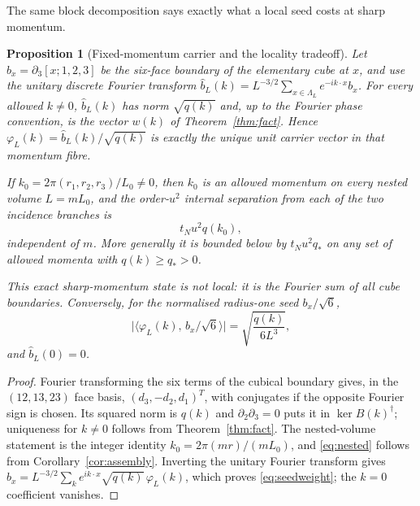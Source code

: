 \documentclass[11pt]{article}
\theoremstyle{plain}
\newtheorem{proposition}[theorem]{Proposition}
\theoremstyle{definition}
\theoremstyle{remark}
\newcommand{\chk}[1]{}
\newcommand{\dg}{^{\dagger}}
\begin{document}
The same block decomposition says exactly what a local seed costs at sharp
momentum.

\begin{proposition}[Fixed-momentum carrier and the locality tradeoff]\label{prop:locality}\label{prop:fixed-k-carrier}
Let $b_x=\partial_3[x;1,2,3]$ be the six-face boundary of the elementary cube
at $x$, and use the unitary discrete Fourier transform
$\hat b_L(k)=L^{-3/2}\sum_{x\in\Lambda_L}e^{-ik\cdot x}b_x$. For every allowed
$k\neq0$, $\hat b_L(k)$ has norm $\sqrt{q(k)}$ and, up to the Fourier phase
convention, is the vector $w(k)$ of Theorem~\ref{thm:fact}. Hence
$\varphi_L(k)=\hat b_L(k)/\sqrt{q(k)}$ is exactly the unique unit carrier
vector in that momentum fibre.

If $k_0=2\pi(r_1,r_2,r_3)/L_0\neq0$, then $k_0$ is an allowed momentum on
every nested volume $L=mL_0$, and the order-$u^2$ internal separation from
each of the two incidence branches is
\begin{equation}\label{eq:nested}
  t_Nu^2q(k_0),
\end{equation}
independent of $m$. More generally it is bounded below by $t_Nu^2q_*$ on any
set of allowed momenta with $q(k)\ge q_*>0$.

This exact sharp-momentum state is not local: it is the Fourier sum of all
cube boundaries. Conversely, for the normalised radius-one seed
$b_x/\sqrt6$,
\begin{equation}\label{eq:seedweight}
  \bigl|\langle\varphi_L(k),\,b_x/\sqrt6\rangle\bigr|
  =\sqrt{\frac{q(k)}{6L^3}},
\end{equation}
and $\hat b_L(0)=0$.
\end{proposition}

\begin{proof}
Fourier transforming the six terms of the cubical boundary gives, in the
$(12,13,23)$ face basis, $(d_3,-d_2,d_1)^T$, with conjugates if the opposite
Fourier sign is chosen. Its squared norm is $q(k)$ and
$\partial_2\partial_3=0$ puts it in $\ker B(k)\dg$; uniqueness for $k\neq0$
follows from Theorem~\ref{thm:fact}. The nested-volume statement is the
integer identity $k_0=2\pi(mr)/(mL_0)$, and \eqref{eq:nested} follows from
Corollary~\ref{cor:assembly}. Inverting the unitary Fourier transform gives
$b_x=L^{-3/2}\sum_k e^{ik\cdot x}\sqrt{q(k)}\,\varphi_L(k)$, which proves
\eqref{eq:seedweight}; the $k=0$ coefficient vanishes.
\end{proof}
\chk{the Fourier sum of cube boundaries IS the carrier, and a local seed costs L\^{}-3}
\end{document}
